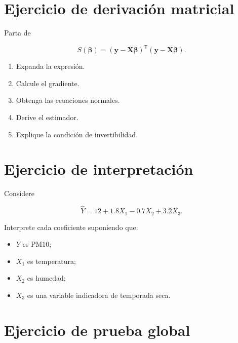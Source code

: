\documentclass[
  spanish,
  10.5pt,
  letterpaper,
  DIV=11,
  numbers=noendperiod,
  oneside,
  open=any]{scrreprt}
\providecommand{\tightlist}{%
  \setlength{\itemsep}{0pt}\setlength{\parskip}{0pt}}
\theoremstyle{definition}
\theoremstyle{definition}
\theoremstyle{plain}
\theoremstyle{remark}
\begin{document}
\section*{Ejercicio de derivación
matricial}\label{ejercicio-de-derivaciuxf3n-matricial}


Parta de

\[
S(\boldsymbol{\beta})
=
(\mathbf{y}-\mathbf{X}\boldsymbol{\beta})^{\mathsf T}
(\mathbf{y}-\mathbf{X}\boldsymbol{\beta}).
\]

\begin{enumerate}
\def\labelenumi{\arabic{enumi}.}
\tightlist
\item
  Expanda la expresión.
\item
  Calcule el gradiente.
\item
  Obtenga las ecuaciones normales.
\item
  Derive el estimador.
\item
  Explique la condición de invertibilidad.
\end{enumerate}

\section*{Ejercicio de
interpretación}\label{ejercicio-de-interpretaciuxf3n}


Considere

\[
\widehat{Y}
=
12
+
1.8X_1
-
0.7X_2
+
3.2X_3.
\]

Interprete cada coeficiente suponiendo que:

\begin{itemize}
\tightlist
\item
  \(Y\) es PM10;
\item
  \(X_1\) es temperatura;
\item
  \(X_2\) es humedad;
\item
  \(X_3\) es una variable indicadora de temporada seca.
\end{itemize}

\section*{Ejercicio de prueba global}\label{ejercicio-de-prueba-global}
\end{document}
